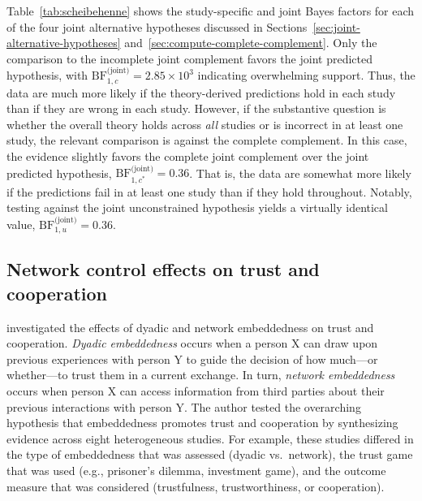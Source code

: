 \documentclass[letterpaper,11pt,oneside]{article}
\begin{document}
Table~\ref{tab:scheibehenne} shows the study-specific and joint Bayes factors for each of the four joint alternative hypotheses discussed in Sections~\ref{sec:joint-alternative-hypotheses} and~\ref{sec:compute-complete-complement}. Only the comparison to the incomplete joint complement favors the joint predicted hypothesis, with $\mathrm{BF}_{1,c}^{\text{(joint)}}=2.85 \times 10^3$ indicating overwhelming support. Thus, the data are much more likely if the theory-derived predictions hold in each study than if they are wrong in each study. However, if the substantive question is whether the overall theory holds across \emph{all} studies or is incorrect in at least one study, the relevant comparison is against the complete complement. In this case, the evidence slightly favors the complete joint complement over the joint predicted hypothesis, $\mathrm{BF}_{1,c^{*}}^{\text{(joint)}}=0.36$. That is, the data are somewhat more likely if the predictions fail in at least one study than if they hold throughout. Notably, testing against the joint unconstrained hypothesis yields a virtually identical value, $\mathrm{BF}_{1,u}^{\text{(joint)}}=0.36$.

\subsection{Network control effects on trust and cooperation %
}

\textcite{volkerFutureMadeToday2022} investigated the effects of dyadic and network embeddedness on trust and cooperation. \textit{Dyadic embeddedness} occurs when a person X can draw upon previous experiences with person Y to guide the decision of how much---or whether---to trust them in a current exchange. In turn, \textit{network embeddedness} occurs when person X can access information from third parties about their previous interactions with person Y. The author tested the overarching hypothesis that embeddedness promotes trust and cooperation by synthesizing evidence across eight heterogeneous studies. For example, these studies differed in the type of embeddedness that was assessed (dyadic vs.\ network), the trust game that was used (e.g., prisoner's dilemma, investment game), and the outcome measure that was considered (trustfulness, trustworthiness, or cooperation).
\end{document}
